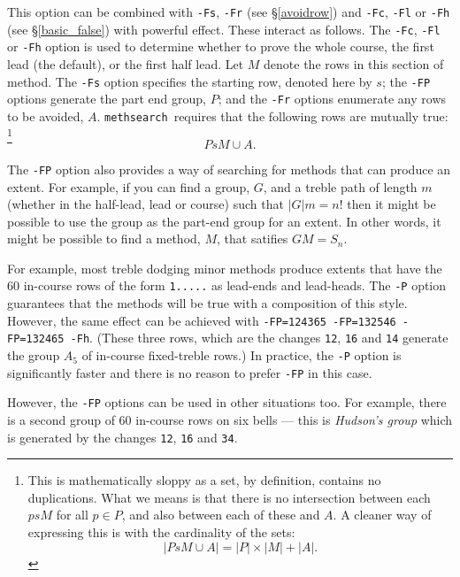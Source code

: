 \documentclass[a4paper,11pt,oneside]{book}
\makeatletter
\newcommand{\oi}[1]{\index{#1@{\hspace*{-\optwidth}\texttt{-}\texttt{#1}}}}
\def\methsearch{\texttt{meth\-search}}
\newcommand{\sref}[1]{\hyperref[#1]{\S\ref{#1}}}
\makeatother
\begin{document}
This option can be combined with \verb+-Fs+,\oi{Fs} \verb+-Fr+\oi{Fr} 
(see \sref{avoidrow}) and \verb+-Fc+,\oi{Fc} \verb+-Fl+\oi{Fl} or 
\verb+-Fh+\oi{Fh} (see \sref{basic_false}) with powerful effect.  
These interact as follows.
The \verb+-Fc+, \verb+-Fl+ or \verb+-Fh+ option is used to determine whether
to prove the whole course, the first lead (the default), or the first half
lead.  Let $M$ denote the rows in this section of method.
The \verb+-Fs+ option specifies the starting row, denoted here by $s$;
the \verb+-FP+ options generate the part end group, $P$; and 
the \verb+-Fr+ options enumerate any rows to be avoided, $A$.
\methsearch\ requires that the following rows are mutually true:%
\footnote{This is mathematically sloppy as a set, by definition,
contains no duplications.  What we means is that there is no intersection
between each $psM$ for all $p \in P$, and also between each of these and $A$.
A cleaner way of expressing this is with the cardinality%
 of the sets: 
\[ \left| P s M \cup A \right| 
 = \left|P\right| \times \left|M\right| + \left|A\right|. \]
} %
\[ PsM \cup A. \]

The \verb+-FP+ option also provides a way of searching for methods that
can produce an extent.
For example, if you can find a group, $G$, and a treble path of length $m$ 
(whether in the half-lead, lead or course) such that $\left|G\right|m = n!$
then it might be possible to use the group as the part-end group for an extent.
In other words, it might be possible to find a method, $M$, that satifies
$GM=S_n$.  

For example, most treble dodging minor methods produce extents
that have the {60} in-course rows of the form \verb+1.....+ as lead-ends
and lead-heads.  The \verb+-P+ option guarantees that the methods will be
true with a composition of this style.  However, the same effect can be 
achieved with \verb+-FP=124365 -FP=132546 -FP=132465 -Fh+.  (These three 
rows, which are the changes \verb+12+, \verb+16+ and \verb+14+ generate
the group $A_5$ of in-course fixed-treble rows.)  In practice, the \verb+-P+
option is significantly faster and there is no reason to prefer \verb+-FP+
in this case.\oi{P}

However, the \verb+-FP+ options can be used in other situations too.  For
example, there is a second group of {60} in-course rows on six bells ---
this is \textit{Hudson's group}%
 which is generated by the changes
\verb+12+, \verb+16+ and \verb+34+.
\end{document}
